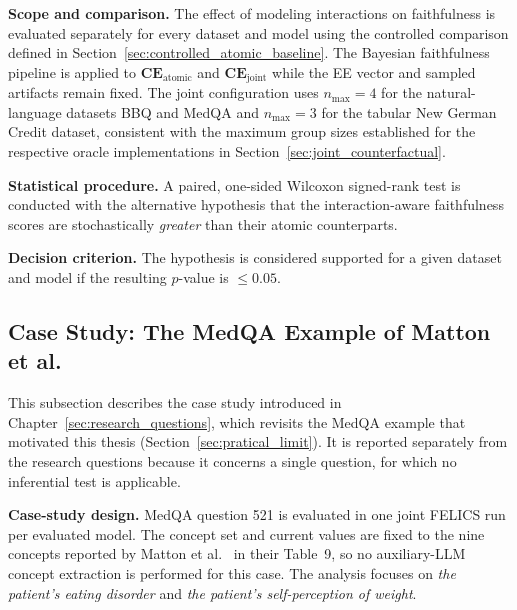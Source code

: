 \noindent\textbf{Scope and comparison.} The effect of modeling interactions on faithfulness is evaluated separately for every dataset and model using the controlled comparison defined in Section~\ref{sec:controlled_atomic_baseline}. The Bayesian faithfulness pipeline is applied to $\mathbf{CE}_{\mathrm{atomic}}$ and $\mathbf{CE}_{\mathrm{joint}}$ while the EE vector and sampled artifacts remain fixed. The joint configuration uses $n_{\max}=4$ for the natural-language datasets BBQ and MedQA and $n_{\max}=3$ for the tabular New German Credit dataset, consistent with the maximum group sizes established for the respective oracle implementations in Section~\ref{sec:joint_counterfactual}.

\noindent\textbf{Statistical procedure.} A paired, one-sided Wilcoxon signed-rank test is conducted with the alternative hypothesis that the interaction-aware faithfulness scores are stochastically \emph{greater} than their atomic counterparts.

\noindent\textbf{Decision criterion.} The hypothesis is considered supported for a given dataset and model if the resulting $p$-value is $\le 0.05$.

\subsection{Case Study: The MedQA Example of Matton et al.}
\label{sec:motivating_methodology}
This subsection describes the case study introduced in Chapter~\ref{sec:research_questions}, which revisits the MedQA example that motivated this thesis (Section~\ref{sec:pratical_limit}). It is reported separately from the research questions because it concerns a single question, for which no inferential test is applicable.

\noindent\textbf{Case-study design.} MedQA question 521 is evaluated in one joint FELICS run per evaluated model. The concept set and current values are fixed to the nine concepts reported by Matton et al.~\cite{mattonWalkTalkMeasuring2024} in their Table~9, so no auxiliary-LLM concept extraction is performed for this case. The analysis focuses on \textit{the patient's eating disorder} and \textit{the patient's self-perception of weight}.

